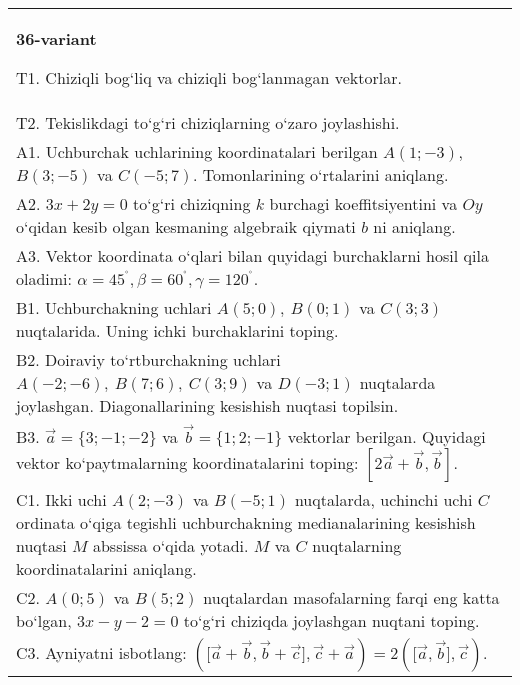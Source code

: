 \documentclass{article}
\begin{document}
\begin{tabular}{m{17cm}}
\textbf{36-variant}
\newline

T1. 
Chiziqli bog‘liq va chiziqli bog‘lanmagan vektorlar.
 \\
T2. 
Tekislikdagi to‘g‘ri chiziqlarning o‘zaro joylashishi.
 \\
A1. 
Uchburchak uchlarining koordinatalari berilgan
$A (1;-3) $, $B (3;-5) $ va $C (-5;7) $. Tomonlarining o‘rtalarini
aniqlang.
 \\
A2. 
$3x+2y=0$ to‘g‘ri chiziqning $k$ burchagi
koeffitsiyentini va $Oy$ o‘qidan kesib olgan kesmaning algebraik
qiymati $b$ ni aniqlang.
 \\
A3. Vektor koordinata o‘qlari bilan quyidagi burchaklarni hosil qila oladimi:
$\alpha = 45^{{^\circ}},\beta = 60^{{^\circ}},\gamma = 120^{{^\circ}}$.
 \\
B1. 
Uchburchakning uchlari \(A (5;0),\ B (0;1) \) va \(C (3;3) \)
nuqtalarida. Uning ichki burchaklarini toping.
 \\
B2. 
Doiraviy to‘rtburchakning uchlari
\(A (-2;-6),\ B (7;6),\ C (3;9) \) va \(D (-3;1) \) nuqtalarda
joylashgan. Diagonallarining kesishish nuqtasi topilsin.
 \\
B3. 
$\vec{a} = \{ 3; - 1; - 2\}$ va $\vec{b} = \{ 1;2; - 1\}$ vektorlar berilgan. Quyidagi vektor ko‘paytmalarning koordinatalarini toping:
$\left\lbrack 2\vec{a} + \vec{b},\vec{b} \right\rbrack$.
 \\
C1. 
Ikki uchi \(A (2; - 3) \) va \(B (-5;1) \) nuqtalarda,
uchinchi uchi $C$ ordinata o‘qiga tegishli uchburchakning
medianalarining kesishish nuqtasi $M$ abssissa o‘qida yotadi.
$M$ va $C$ nuqtalarning koordinatalarini aniqlang.
 \\
C2. 
\(A (0;5) \) va \(B (5;2) \) nuqtalardan masofalarning
farqi eng katta bo‘lgan, \(3x - y - 2 = 0\) to‘g‘ri chiziqda joylashgan
nuqtani toping.
 \\
C3. 
Ayniyatni isbotlang: \((\lbrack\vec{a} + \vec{b},\vec{b} + \vec{c}\rbrack,\vec{c} + \vec{a}) = 2 (\lbrack\vec{a},\vec{b}\rbrack,\vec{c}) \).
 \\

\end{tabular}
\vspace{1cm}
\end{document}
